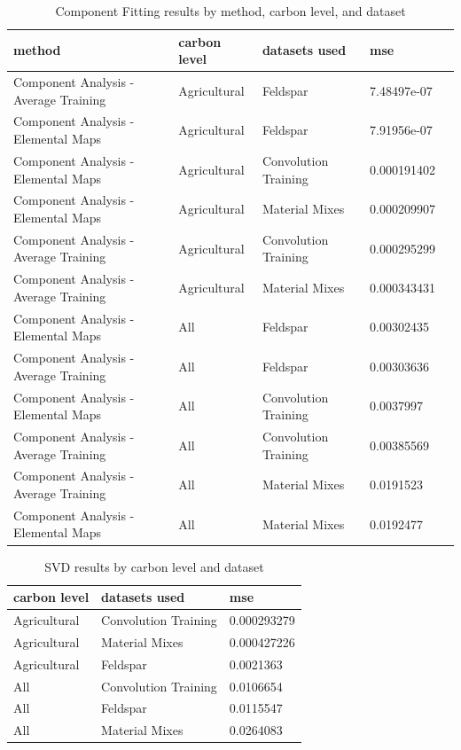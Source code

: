 \documentclass[review]{elsarticle}
\begin{document}
\begin{table}[H]
\centering
\caption{Component Fitting results by method, carbon level, and dataset}
\label{tab:component_fitting_results}
\begin{tabular}{@{}lllll@{}}
\toprule
method & carbon level & datasets used & mse \\
\midrule
Component Analysis - Average Training & Agricultural & Feldspar & 7.48497e-07 \\
Component Analysis - Elemental Maps & Agricultural & Feldspar & 7.91956e-07 \\
Component Analysis - Elemental Maps & Agricultural & Convolution Training & 0.000191402 \\
Component Analysis - Elemental Maps & Agricultural & Material Mixes & 0.000209907 \\
Component Analysis - Average Training & Agricultural & Convolution Training & 0.000295299 \\
Component Analysis - Average Training & Agricultural & Material Mixes & 0.000343431 \\
Component Analysis - Elemental Maps & All & Feldspar & 0.00302435 \\
Component Analysis - Average Training & All & Feldspar & 0.00303636 \\
Component Analysis - Elemental Maps & All & Convolution Training & 0.0037997 \\
Component Analysis - Average Training & All & Convolution Training & 0.00385569 \\
Component Analysis - Average Training & All & Material Mixes & 0.0191523 \\
Component Analysis - Elemental Maps & All & Material Mixes & 0.0192477 \\
\bottomrule
\end{tabular}
\end{table}

\begin{table}[H]
\centering
\caption{SVD results by carbon level and dataset}
\label{tab:svd_results}
\begin{tabular}{@{}lll@{}}
\toprule
carbon level & datasets used & mse \\
\midrule
Agricultural & Convolution Training & 0.000293279 \\
Agricultural & Material Mixes & 0.000427226 \\
Agricultural & Feldspar & 0.0021363 \\
All & Convolution Training & 0.0106654 \\
All & Feldspar & 0.0115547 \\
All & Material Mixes & 0.0264083 \\
\bottomrule
\end{tabular}
\end{table}
\end{document}
